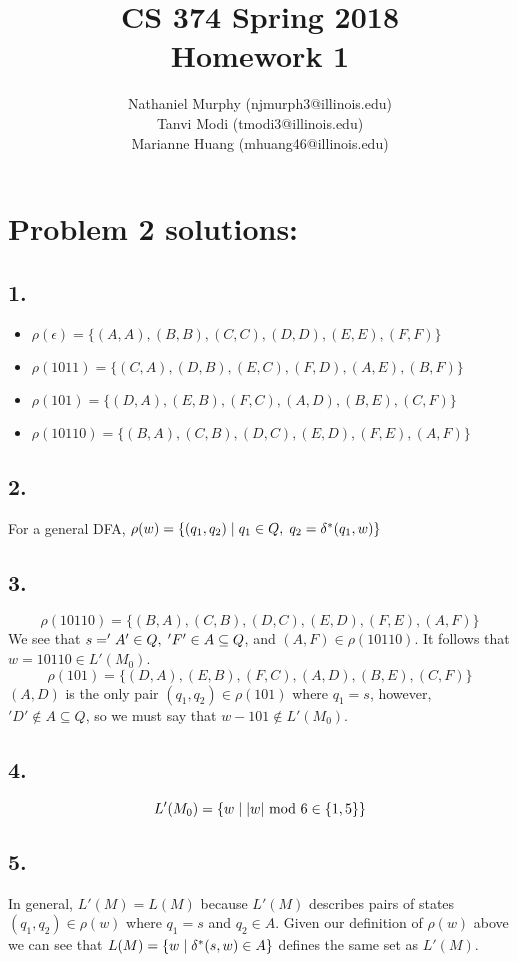 \documentclass[11pt]{article}
\title{\textbf{CS 374 Spring 2018 \\
				Homework 1}}
\author{Nathaniel Murphy (njmurph3@illinois.edu) \\
		Tanvi Modi (tmodi3@illinois.edu) \\
		Marianne Huang (mhuang46@illinois.edu)}
\date{}
\begin{document}
\maketitle

\section*{Problem 2 solutions:}
\subsection*{1.}
\begin{itemize}
	\item $\rho(\epsilon)=\{(A,A),(B,B),(C,C),(D,D),(E,E),(F,F)\}$
	\item $\rho(1011)=\{(C,A),(D,B),(E,C),(F,D),(A,E),(B,F)\}$
	\item $\rho(101)=\{(D,A),(E,B),(F,C),(A,D),(B,E),(C,F)\}$
	\item $\rho(10110)=\{(B,A),(C,B),(D,C),(E,D),(F,E),(A,F)\}$
\end{itemize}
\subsection*{2.}
For a general DFA, $\rho(w)=\{(q_1,q_2)\hspace{1mm}|\hspace{1mm}q_1\in Q,\hspace{1mm}q_2=\delta^*(q_1,w)\}$
\subsection*{3.}
\[\rho(10110)=\{(B,A),(C,B),(D,C),(E,D),(F,E),(A,F)\}\]
We see that $s='A'\in Q,\hspace{1mm}'F'\in A\subseteq Q$, and $(A,F)\in \rho(10110)$. It follows that $w=10110\in L'(M_0)$.
\[\rho(101)=\{(D,A),(E,B),(F,C),(A,D),(B,E),(C,F)\}\]
$(A,D)$ is the only pair $(q_1,q_2)\in\rho(101)$ where $q_1=s$, however, $'D'\notin A\subseteq Q$, so we must say that $w-101\notin L'(M_0)$.
\subsection*{4.}
\[L'(M_0)=\{w\hspace{1mm}|\hspace{1mm}|w|\text{ mod }6\in\{1,5\}\}\]
\subsection*{5.}
In general, $L'(M)=L(M)$ because $L'(M)$ describes pairs of states $(q_1,q_2)\in\rho(w)$ where $q_1=s$ and $q_2\in A$. Given our definition of $\rho(w)$ above we can see that $L(M)=\{w\hspace{1mm}|\hspace{1mm}\delta^*(s,w)\in A\}$ defines the same set as $L'(M)$.
\end{document}
